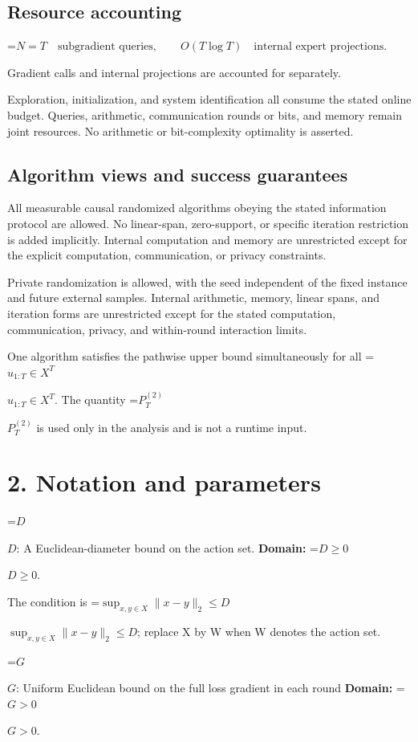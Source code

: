 \documentclass[10pt,a4paper]{article}
\newcommand{\AtlasMath}[1]{\par\begingroup\centering\setbox0=\hbox{$\displaystyle #1$}\ifdim\wd0>1.4\linewidth\typeout{ATLAS WIDE FORMULA: \the\wd0}\fi\ifdim\wd0>\linewidth\resizebox{\linewidth}{!}{\box0}\else\box0\fi\par\endgroup}
\newcommand{\AtlasInlineMath}[1]{\begingroup\setbox0=\hbox{$#1$}\ifdim\wd0>.4\linewidth\endgroup\AtlasMath{#1}\else\endgroup$#1$\fi}
\begin{document}
\subsection{Resource accounting}

\AtlasMath{N=T\quad\text{subgradient queries},\qquad O(T\log T)\quad\text{internal expert projections}.}


Gradient calls and internal projections are accounted for separately.

Exploration, initialization, and system identification all consume the stated online budget. Queries, arithmetic, communication rounds or bits, and memory remain joint resources. No arithmetic or bit-complexity optimality is asserted.

\subsection{Algorithm views and success guarantees}
All measurable causal randomized algorithms obeying the stated information protocol are allowed. No linear-span, zero-support, or specific iteration restriction is added implicitly. Internal computation and memory are unrestricted except for the explicit computation, communication, or privacy constraints.

Private randomization is allowed, with the seed independent of the fixed instance and future external samples. Internal arithmetic, memory, linear spans, and iteration forms are unrestricted except for the stated computation, communication, privacy, and within-round interaction limits.

One algorithm satisfies the pathwise upper bound simultaneously for all \AtlasInlineMath{u_{1:T}\in X^T}. The quantity \AtlasInlineMath{P_T^{(2)}} is used only in the analysis and is not a runtime input.

\section{2. Notation and parameters}
\AtlasInlineMath{D}: A Euclidean-diameter bound on the action set. \textbf{Domain:} \AtlasInlineMath{D\ge0}.

The condition is \AtlasInlineMath{\sup_{x,y\in X}\|x-y\|_2\le D}; replace X by W when W denotes the action set.

\AtlasInlineMath{G}: Uniform Euclidean bound on the full loss gradient in each round \textbf{Domain:} \AtlasInlineMath{G>0}.
\end{document}
